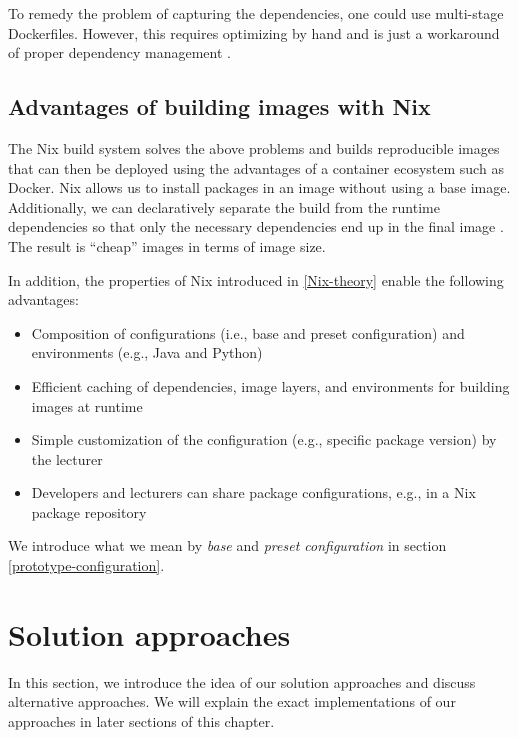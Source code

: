 To remedy the problem of capturing the dependencies, one could use multi-stage Dockerfiles. However, this requires optimizing by hand and is just a workaround of proper dependency management \cite{Wagner2021}.
\subsection{Advantages of building images with Nix}
The Nix build system solves the above problems and builds reproducible images that can then be deployed using the advantages of a container ecosystem such as Docker. Nix allows us to install packages in an image without using a base image. Additionally, we can declaratively separate the build from the runtime dependencies so that only the necessary dependencies end up in the final image \cite{Wagner2021}. The result is ``cheap'' images in terms of image size. 

In addition, the properties of Nix introduced in \ref{Nix-theory} enable the following advantages:
\begin{itemize}
  \item Composition of configurations (i.e., base and preset configuration) and environments (e.g., Java and Python)
  \item Efficient caching of dependencies, image layers, and environments for building images at runtime
  \item Simple customization of the configuration (e.g., specific package version) by the lecturer
  \item Developers and lecturers can share package configurations, e.g., in a Nix package repository
\end{itemize}
We introduce what we mean by \emph{base} and \emph{preset configuration} in section \ref{prototype-configuration}.

\section{Solution approaches}
In this section, we introduce the idea of our solution approaches and discuss alternative approaches. We will explain the exact implementations of our approaches in later sections of this chapter. 

